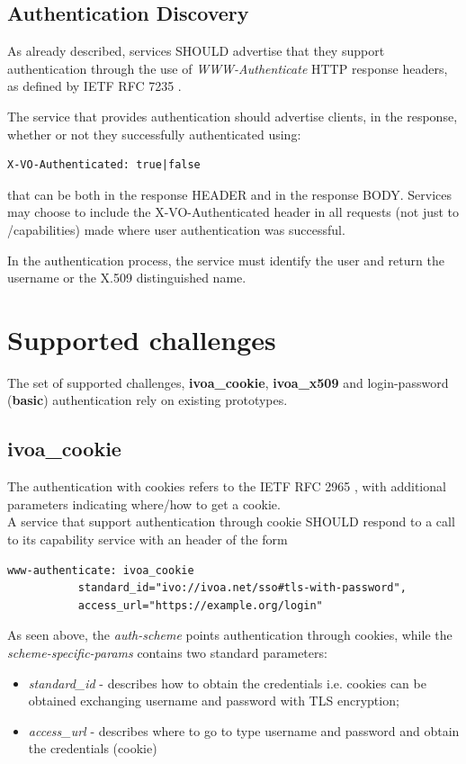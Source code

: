 \documentclass[11pt,a4paper]{ivoa}
\begin{document}
\subsection{Authentication Discovery}
As already described, services SHOULD
advertise that they support authentication through the use of
\emph{WWW-Authenticate} HTTP response headers, as defined by
IETF RFC 7235 \citep{std:RFC7235}. 

The service that provides authentication should advertise clients, 
in the response, whether or not they successfully authenticated using:
\begin{verbatim}
X-VO-Authenticated: true|false
\end{verbatim}
that can be both in the response HEADER and in the response BODY. 
Services may choose to include the X-VO-Authenticated header in all
requests (not just to /capabilities) made where user authentication was successful.

In the authentication process, the service must identify the user 
and return the username or the X.509 distinguished name.


\section{Supported challenges}
The set of supported challenges, {\bf ivoa\_cookie},
{\bf ivoa\_x509} and login-password ({\bf basic}) authentication
rely on existing prototypes.

\subsection{ivoa\_cookie}
The authentication with cookies refers to the IETF RFC 2965 \citep{rfc6265}, with additional parameters indicating where/how to get a cookie.\\
A service that support authentication through cookie SHOULD
respond to a call to its capability service with an header
of the form
\begin{verbatim}
www-authenticate: ivoa_cookie 
           standard_id="ivo://ivoa.net/sso#tls-with-password", 
           access_url="https://example.org/login"
\end{verbatim}
As seen above, the \emph{auth-scheme} points authentication 
through cookies, while the \emph{scheme-specific-params} contains 
two standard parameters:
\begin{itemize}
\item{\emph{standard\_id}} - describes how to obtain the 
credentials i.e. cookies can be obtained exchanging
username and password with TLS encryption;
\item{\emph{access\_url}} - describes where to go to type
username and password and obtain the credentials (cookie)
\end{itemize}
\end{document}
